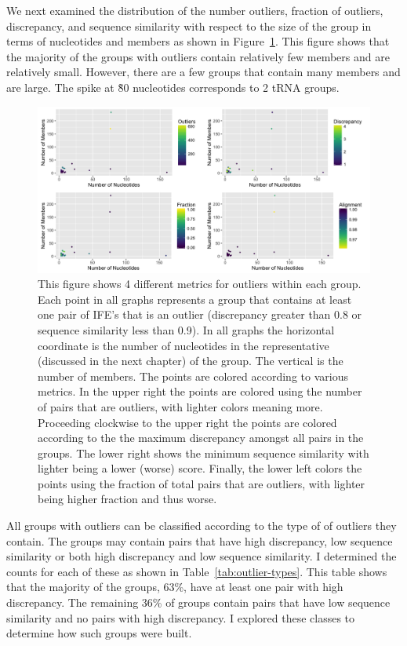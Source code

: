 We next examined the distribution of the number outliers, fraction of outliers,
discrepancy, and sequence similarity with respect to the size of the group in
terms of nucleotides and members as shown in Figure~\ref{fig:outlier-detail}.
This figure shows that the majority of the groups with outliers contain
relatively few members and are relatively small. However, there are a few groups
that contain many members and are large. The spike at \~80 nucleotides
corresponds to 2 tRNA groups.

\begin{figure}[h]
  \includegraphics[width=\textwidth]{chapter-3/figs/outlier-details}
  \caption{This figure shows 4 different metrics for outliers within each group.
    Each point in all graphs represents a group that contains at least one pair
    of IFE’s that is an outlier (discrepancy greater than 0.8 or sequence
    similarity less than 0.9). In all graphs the horizontal coordinate is the
    number of nucleotides in the representative (discussed in the next chapter)
    of the group. The vertical is the number of members. The points are colored
    according to various metrics. In the upper right the points are colored
    using the number of pairs that are outliers, with lighter colors meaning
    more. Proceeding clockwise to the upper right the points are colored
    according to the the maximum discrepancy amongst all pairs in the groups.
    The lower right shows the minimum sequence similarity with lighter being a
    lower (worse) score. Finally, the lower left colors the points using the
    fraction of total pairs that are outliers, with lighter being higher
  fraction and thus worse.}
  \label{fig:outlier-detail}
\end{figure}

All groups with outliers can be classified according to the type of of outliers
they contain. The groups may contain pairs that have high discrepancy, low
sequence similarity or both high discrepancy and low sequence similarity. I
determined the counts for each of these as shown in
Table~\ref{tab:outlier-types}. This table shows that the majority of the groups,
63\%, have at least one pair with high discrepancy. The remaining 36\% of groups
contain pairs that have low sequence similarity and no pairs with high
discrepancy. I explored these classes to determine how such groups were built.

